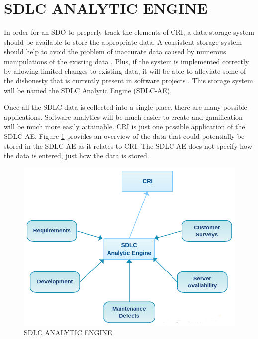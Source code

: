 \documentclass[SDSUThesis.tex]{subfiles}
\begin{document}
\section{SDLC ANALYTIC ENGINE}
\label{sec:SDLC-AE}

    In order for an SDO to properly track the elements of CRI, a data storage 
    system should be available to store the appropriate data.  A consistent 
    storage system should help to avoid the problem of inaccurate
    data caused by numerous manipulations of the existing data 
    \cite{Olson2003}. Plus, if the system
    is implemented correctly by allowing limited changes to existing data, 
    it will be able to alleviate
    some of the dishonesty that is currently present in software projects 
    \cite{Rost2011}. This storage system will be named the SDLC Analytic 
    Engine (SDLC-AE). 
    
    Once all the SDLC data is collected into a single place, there are 
    many possible applications.  Software analytics
    will be much easier to create and gamification will be much more easily attainable.  
    CRI is just one possible application of the SDLC-AE.  Figure \ref{fig:sdlc-ae} 
    provides an overview of 
    the data that could potentially be stored in the SDLC-AE as it relates to CRI. The
    SDLC-AE does not specify how the data is entered, just how the data is stored.
    
    \begin{figure}[ht]
        \includegraphics[scale=.75]{images/sdlcae.png}
        \caption{SDLC ANALYTIC ENGINE}
        \label{fig:sdlc-ae}
    \end{figure}
    
\end{document}
